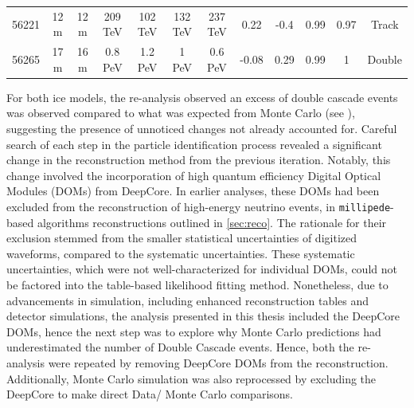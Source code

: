 \begin{table}[h!]
\begin{tabular}{c|cc|cc|cc|cc|cc|c}
        56221   &  12 m   & \cellcolor{lightgray}12 m    & 209 TeV   &   \cellcolor{lightgray}102 TeV  &   132 TeV  &   \cellcolor{lightgray}237 TeV  &   0.22  &   \cellcolor{lightgray}-0.4 & 0.99 &  \cellcolor{lightgray}0.97& \cellcolor{lightgray}Track\\
            
        56265   &  17 m   & \cellcolor{lightgray}16 m    & 0.8 PeV   &   \cellcolor{lightgray}1.2 PeV  &   1 PeV  &   \cellcolor{lightgray}0.6 PeV  &   -0.08  &   \cellcolor{lightgray}0.29 & 0.99 &  \cellcolor{lightgray}1& \cellcolor{lightgray}Double\\
            \bottomrule
    \end{tabular}
\end{table}

For both ice models, the re-analysis observed an excess of double cascade events was observed compared to what was expected from Monte Carlo (see ), suggesting the presence of unnoticed changes not already accounted for. Careful search of each step in the particle identification process revealed a significant change in the reconstruction method from the previous iteration. Notably, this change involved the incorporation of high quantum efficiency Digital Optical Modules (DOMs) from DeepCore. In earlier analyses, these DOMs had been excluded from the reconstruction of high-energy neutrino events, in \texttt{millipede}-based algorithms reconstructions outlined in \ref{sec:reco}. The rationale for their exclusion stemmed from the smaller statistical uncertainties of digitized waveforms, compared to the systematic uncertainties. These systematic uncertainties, which were not well-characterized for individual DOMs, could not be factored into the table-based likelihood fitting method. Nonetheless, due to advancements in simulation, including enhanced reconstruction tables and detector simulations, the analysis presented in this thesis included the DeepCore DOMs, hence the next step was to explore why Monte Carlo predictions had underestimated the number of Double Cascade events. Hence, both the re-analysis were repeated by removing DeepCore DOMs from the reconstruction. Additionally, Monte Carlo simulation was also reprocessed by excluding the DeepCore to make direct Data/ Monte Carlo comparisons.

